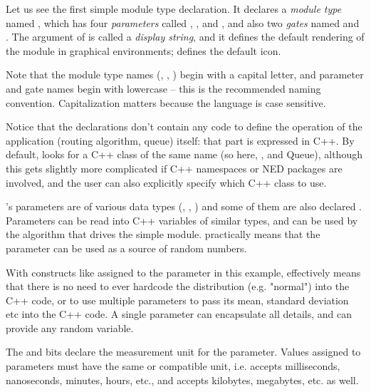 Let us see the first simple module type declaration. It declares a
\textit{module type} named , which has four \textit{parameters}
called , ,  and ,
and also two \textit{gates} named  and . The argument of
 is called a \textit{display string}, and it defines
the default rendering of the module in graphical environments;
 defines the default icon.

\begin{note}
    Note that the module type names (, , )
    begin with a capital letter, and parameter and gate names begin with
    lowercase -- this is the recommended naming convention. Capitalization
    matters because the language is case sensitive.
\end{note}

Notice that the declarations don't contain any code to define the operation
of the application (routing algorithm, queue) itself:
that part is expressed in C++. By default, {\opp} looks for a
C++ class of the same name (so here, ,  and {Queue}),
although this gets slightly more complicated if C++ namespaces or
NED packages are involved, and the user can also explicitly specify
which C++ class to use.

's parameters are of various data types (, ,
) and some of them are also declared . Parameters
can be read into C++ variables of similar types, and can be used by the
algorithm that drives the simple module.  practically means
that the parameter can be used as a source of random numbers.

\begin{note}
    With constructs like  assigned to the 
    parameter in this example,  effectively means that
    there is no need to ever hardcode the distribution (e.g. "normal")
    into the C++ code, or to use multiple parameters to pass its mean,
    standard deviation etc into the C++ code. A single parameter can
    encapsulate all details, and can provide any random variable.
\end{note}

The  and  bits declare the measurement unit
for the parameter. Values assigned to parameters must have the same or
compatible unit, i.e.  accepts milliseconds, nanoseconds,
minutes, hours, etc., and  accepts kilobytes, megabytes,
etc. as well.

